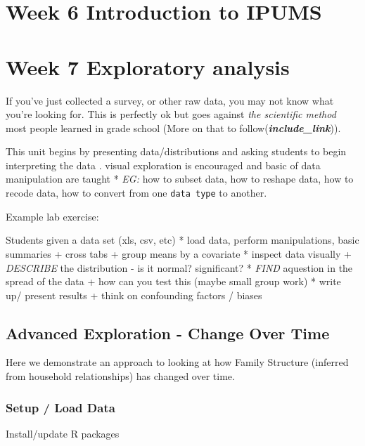 \documentclass[
]{book}
\begin{document}
\hypertarget{week-6-introduction-to-ipums}{%
\section{Week 6 Introduction to IPUMS}\label{week-6-introduction-to-ipums}}

\hypertarget{exploratory}{%
\section{Week 7 Exploratory analysis}\label{exploratory}}

If you've just collected a survey, or other raw data, you may not know what you're looking for. This is perfectly ok but goes against \emph{the scientific method} most people learned in grade school (More on that to follow(\textbf{\emph{include\_link}})).

This unit begins by presenting data/distributions and asking students to begin interpreting the data . visual exploration is encouraged and basic of data manipulation are taught
* \emph{EG:} how to subset data, how to reshape data, how to recode data, how to convert from one \texttt{data\ type} to another.

Example lab exercise:

Students given a data set (xls, csv, etc)
* load data, perform manipulations, basic summaries
+ cross tabs
+ group means by a covariate
* inspect data visually
+ \emph{DESCRIBE} the distribution - is it normal? significant?
* \emph{FIND} aquestion in the spread of the data
+ how can you test this (maybe small group work)
* write up/ present results
+ think on confounding factors / biases

\hypertarget{advanced-exploration---change-over-time}{%
\subsection{Advanced Exploration - Change Over Time}\label{advanced-exploration---change-over-time}}

Here we demonstrate an approach to looking at how Family Structure (inferred from household relationships) has changed over time.

\hypertarget{setup-load-data}{%
\subsubsection{Setup / Load Data}\label{setup-load-data}}

Install/update R packages
\end{document}
